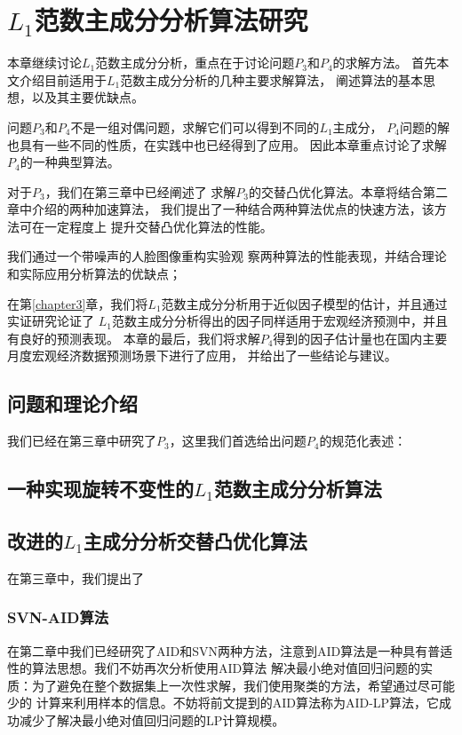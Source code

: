 \section{$L_1$范数主成分分析算法研究}
本章继续讨论$L_1$范数主成分分析，重点在于讨论问题$P_3$和$P_4$的求解方法。
首先本文介绍目前适用于$L_1$范数主成分分析的几种主要求解算法，
阐述算法的基本思想，以及其主要优缺点。

问题$P_3$和$P_4$不是一组对偶问题，求解它们可以得到不同的$L_1$主成分，
$P_4$问题的解也具有一些不同的性质，在实践中也已经得到了应用。
因此本章重点讨论了求解$P_4$的一种典型算法。

对于$P_3$，我们在第三章中已经阐述了
求解$P_3$的交替凸优化算法。本章将结合第二章中介绍的两种加速算法，
我们提出了一种结合两种算法优点的快速方法，该方法可在一定程度上
提升交替凸优化算法的性能。

我们通过一个带噪声的人脸图像重构实验观
察两种算法的性能表现，并结合理论和实际应用分析算法的优缺点；

在第\ref{chapter3}章，我们将$L_1$范数主成分分析用于近似因子模型的估计，并且通过实证研究论证了
$L_1$范数主成分分析得出的因子同样适用于宏观经济预测中，并且有良好的预测表现。
本章的最后，我们将求解$P_4$得到的因子估计量也在国内主要月度宏观经济数据预测场景下进行了应用，
并给出了一些结论与建议。

\subsection{问题和理论介绍}
我们已经在第三章中研究了$P_3$，这里我们首选给出问题$P_4$的规范化表述：
\begin{equation}
\end{equation}

\subsection{一种实现旋转不变性的$L_1$范数主成分分析算法}

\subsection{改进的$L_1$主成分分析交替凸优化算法}

在第三章中，我们提出了

\subsubsection{SVN-AID算法}
在第二章中我们已经研究了AID和SVN两种方法，注意到AID算法是一种具有普适性的算法思想。我们不妨再次分析使用AID算法
解决最小绝对值回归问题的实质：为了避免在整个数据集上一次性求解，我们使用聚类的方法，希望通过尽可能少的
计算来利用样本的信息。不妨将前文提到的AID算法称为AID-LP算法，它成功减少了解决最小绝对值回归问题的LP计算规模。

